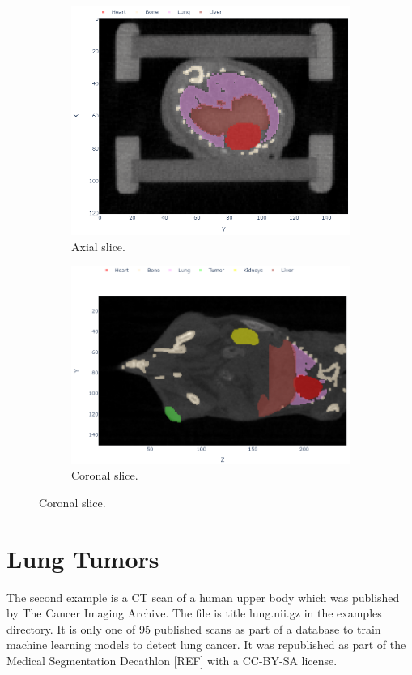 \begin{figure}[h]
	\centering
	\begin{subfigure}[t]{0.4\linewidth}
		\centering
		\includegraphics[width=\linewidth]{figures/mouse_axial.png}
		\caption{Axial slice.}
	\end{subfigure}
	\hfill
	\begin{subfigure}[t]{0.55\linewidth}
		\centering
		\includegraphics[width=\linewidth]{figures/mouse_coronal.png}
		\caption{Coronal slice.}
	\end{subfigure}
\end{figure}

\section{Lung Tumors}
The second example is a CT scan of a human upper body which was published by The Cancer Imaging Archive. The file is title lung.nii.gz in the examples directory. It is only one of 95 published scans as part of a database to train machine learning models to detect lung cancer. It was republished as part of the Medical Segmentation Decathlon [REF] with a CC-BY-SA license.

